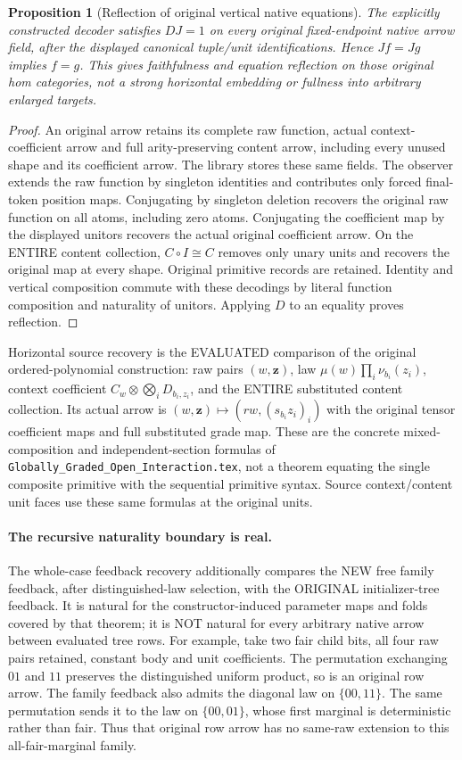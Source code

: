 \documentclass{article}
\newtheorem{proposition}{Proposition}
\begin{document}
\begin{proposition}[Reflection of original vertical native equations]
The explicitly constructed decoder satisfies $DJ=1$ on every original fixed-endpoint native arrow field, after the displayed canonical tuple/unit identifications. Hence $Jf=Jg$ implies $f=g$. This gives faithfulness and equation reflection on those original hom categories, not a strong horizontal embedding or fullness into arbitrary enlarged targets.
\end{proposition}
\begin{proof}
An original arrow retains its complete raw function, actual context-coefficient arrow and full arity-preserving content arrow, including every unused shape and its coefficient arrow. The library stores these same fields. The observer extends the raw function by singleton identities and contributes only forced final-token position maps. Conjugating by singleton deletion recovers the original raw function on all atoms, including zero atoms. Conjugating the coefficient map by the displayed unitors recovers the actual original coefficient arrow. On the ENTIRE content collection, $C\circ I\cong C$ removes only unary units and recovers the original map at every shape. Original primitive records are retained. Identity and vertical composition commute with these decodings by literal function composition and naturality of unitors. Applying $D$ to an equality proves reflection.
\end{proof}

Horizontal source recovery is the EVALUATED comparison of the original ordered-polynomial construction: raw pairs $(w,\mathbf z)$, law $\mu(w)\prod_i\nu_{b_i}(z_i)$, context coefficient $C_w\otimes\bigotimes_iD_{b_i,z_i}$, and the ENTIRE substituted content collection. Its actual arrow is $(w,\mathbf z)\mapsto(rw,(s_{b_i}z_i)_i)$ with the original tensor coefficient maps and full substituted grade map. These are the concrete mixed-composition and independent-section formulas of \texttt{Globally\_Graded\_Open\_Interaction.tex}, not a theorem equating the single composite primitive with the sequential primitive syntax. Source context/content unit faces use these same formulas at the original units.

\paragraph{The recursive naturality boundary is real.}
The whole-case feedback recovery additionally compares the NEW free family feedback, after distinguished-law selection, with the ORIGINAL initializer-tree feedback. It is natural for the constructor-induced parameter maps and folds covered by that theorem; it is NOT natural for every arbitrary native arrow between evaluated tree rows. For example, take two fair child bits, all four raw pairs retained, constant body and unit coefficients. The permutation exchanging $01$ and $11$ preserves the distinguished uniform product, so is an original row arrow. The family feedback also admits the diagonal law on $\{00,11\}$. The same permutation sends it to the law on $\{00,01\}$, whose first marginal is deterministic rather than fair. Thus that original row arrow has no same-raw extension to this all-fair-marginal family.
\end{document}
